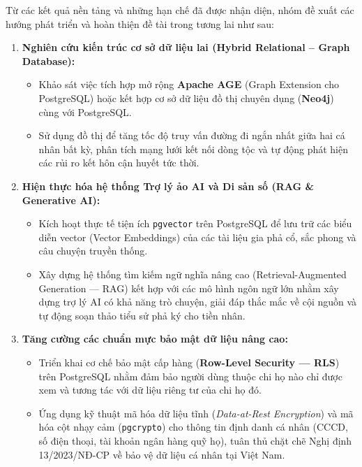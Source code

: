 Từ các kết quả nền tảng và những hạn chế đã được nhận diện, nhóm đề xuất các hướng phát triển và hoàn thiện đề tài trong tương lai như sau:

\begin{enumerate}[leftmargin=*]
    \item \textbf{Nghiên cứu kiến trúc cơ sở dữ liệu lai (Hybrid Relational -- Graph Database):}
    \begin{itemize}
        \item Khảo sát việc tích hợp mở rộng \textbf{Apache AGE} (Graph Extension cho PostgreSQL) hoặc kết hợp cơ sở dữ liệu đồ thị chuyên dụng (\textbf{Neo4j}) cùng với PostgreSQL.
        \item Sử dụng đồ thị để tăng tốc độ truy vấn đường đi ngắn nhất giữa hai cá nhân bất kỳ, phân tích mạng lưới kết nối dòng tộc và tự động phát hiện các rủi ro kết hôn cận huyết tức thời.
    \end{itemize}

    \item \textbf{Hiện thực hóa hệ thống Trợ lý ảo AI và Di sản số (RAG \& Generative AI):}
    \begin{itemize}
        \item Kích hoạt thực tế tiện ích \texttt{pgvector} trên PostgreSQL để lưu trữ các biểu diễn vector (Vector Embeddings) của các tài liệu gia phả cổ, sắc phong và câu chuyện truyền thống.
        \item Xây dựng hệ thống tìm kiếm ngữ nghĩa nâng cao (Retrieval-Augmented Generation --- RAG) kết hợp với các mô hình ngôn ngữ lớn nhằm xây dựng trợ lý AI có khả năng trò chuyện, giải đáp thắc mắc về cội nguồn và tự động soạn thảo tiểu sử phả ký cho tiền nhân.
    \end{itemize}

    \item \textbf{Tăng cường các chuẩn mực bảo mật dữ liệu nâng cao:}
    \begin{itemize}
        \item Triển khai cơ chế bảo mật cấp hàng (\textbf{Row-Level Security --- RLS}) trên PostgreSQL nhằm đảm bảo người dùng thuộc chi họ nào chỉ được xem và tương tác với dữ liệu riêng tư của chi họ đó.
        \item Ứng dụng kỹ thuật mã hóa dữ liệu tĩnh (\textit{Data-at-Rest Encryption}) và mã hóa cột nhạy cảm (\texttt{pgcrypto}) cho thông tin định danh cá nhân (CCCD, số điện thoại, tài khoản ngân hàng quỹ họ), tuân thủ chặt chẽ Nghị định 13/2023/NĐ-CP về bảo vệ dữ liệu cá nhân tại Việt Nam.
    \end{itemize}


\end{enumerate}
